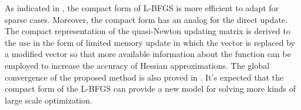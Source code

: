 As indicated in \cite{yueting2007compact}, the compact form of L-BFGS is more efficient to adapt for sparse cases. Moreover, the compact form has an analog for the direct update. The compact representation of the quasi-Newton updating matrix is derived to the use in the form of limited memory update in which the vector is replaced by a modified vector so that more available information about the function can be employed to increase the accuracy of Hessian approximations. The global convergence of the proposed method is also proved in \cite{yueting2007compact}. It’s expected that the compact form of the L-BFGS can provide a new model for solving more kinds of large scale optimization. 



